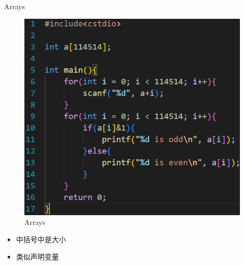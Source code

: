 \documentclass{beamer}
\begin{document}
\begin{frame}{Arrays}
    \begin{minipage}{0.45\linewidth}
        \begin{figure}
        \centering
        \includegraphics[width=\linewidth]{pic/Arrays.png}
        \caption{Arrays}
        \label{fig:Arrays}
    \end{figure}
    \end{minipage}
    \hspace{1cm}
    \begin{minipage}{0.37\linewidth}
        \begin{itemize}
            \item 中括号中是大小
            \item 类似声明变量
        \end{itemize}
    \end{minipage}
\end{frame}
\end{document}
